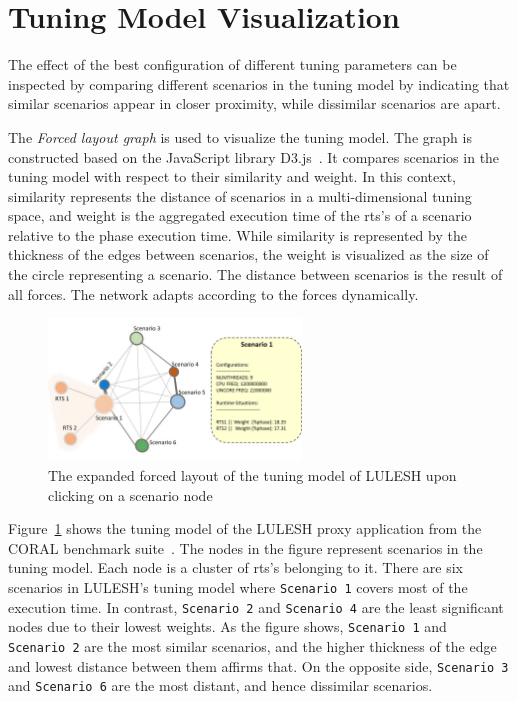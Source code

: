 \section{Tuning Model Visualization} \label{sec:tm-visualization}
The effect of the best configuration of different tuning parameters can be inspected by comparing different scenarios in the tuning model by indicating that similar scenarios appear in closer proximity, while dissimilar scenarios are apart.

The \textit{Forced layout graph} is used to visualize the tuning model. The graph is constructed based on the JavaScript library D3.js~\cite{bostock2011d3}. It compares scenarios in the tuning model with respect to their similarity and weight. In this context, similarity represents the distance of scenarios in a multi-dimensional tuning space, and weight is the aggregated execution time of the rts's of a scenario relative to the phase execution time. While similarity is represented by the thickness of the edges between scenarios, the weight is visualized as the size of the circle representing a scenario. The distance between scenarios is the result of all forces. The network adapts according to the forces dynamically. 

\begin{figure}
	\begin{mdframed}
	\centering
		\includegraphics[width=0.60\textwidth]{figures/luleshTM_expand.jpg}
	\end{mdframed}
	\caption{\label{fig:forced-layout-expand}The expanded forced layout of the tuning model of LULESH upon clicking on a scenario node }
\end{figure}

Figure~\ref{fig:forced-layout-expand} shows the tuning model of the LULESH proxy application from the CORAL benchmark suite~\cite{coral_benchmarks}. The nodes in the figure represent scenarios in the tuning model. Each node is a cluster of rts's belonging to it. There are six scenarios in LULESH's tuning model where \texttt{Scenario~1} covers most of the execution time. In contrast, \texttt{Scenario~2} and \texttt{Scenario~4} are the least significant nodes due to their lowest weights. As the figure shows, \texttt{Scenario~1} and \texttt{Scenario~2} are the most similar scenarios, and the higher thickness of the edge and lowest distance between them affirms that. On the opposite side, \texttt{Scenario~3} and \texttt{Scenario~6} are the most distant, and hence dissimilar scenarios.

